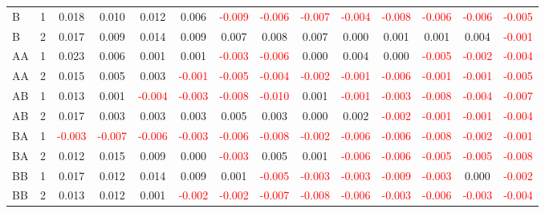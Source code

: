 \begin{table}[H]
{\begin{tabular}{llcccccccccccc}
B & 1 & 0.018 & 0.010 & 0.012 & 0.006 & \textcolor{red}{-0.009} & \textcolor{red}{-0.006} & \textcolor{red}{-0.007} & \textcolor{red}{-0.004} & \textcolor{red}{-0.008} & \textcolor{red}{-0.006} & \textcolor{red}{-0.006} & \textcolor{red}{-0.005}\\
B & 2 & 0.017 & 0.009 & 0.014 & 0.009 & 0.007 & 0.008 & 0.007 & 0.000 & 0.001 & 0.001 & 0.004 & \textcolor{red}{-0.001}\\
AA & 1 & 0.023 & 0.006 & 0.001 & 0.001 & \textcolor{red}{-0.003} & \textcolor{red}{-0.006} & 0.000 & 0.004 & 0.000 & \textcolor{red}{-0.005} & \textcolor{red}{-0.002} & \textcolor{red}{-0.004}\\
AA & 2 & 0.015 & 0.005 & 0.003 & \textcolor{red}{-0.001} & \textcolor{red}{-0.005} & \textcolor{red}{-0.004} & \textcolor{red}{-0.002} & \textcolor{red}{-0.001} & \textcolor{red}{-0.006} & \textcolor{red}{-0.001} & \textcolor{red}{-0.001} & \textcolor{red}{-0.005}\\
AB & 1 & 0.013 & 0.001 & \textcolor{red}{-0.004} & \textcolor{red}{-0.003} & \textcolor{red}{-0.008} & \textcolor{red}{-0.010} & 0.001 & \textcolor{red}{-0.001} & \textcolor{red}{-0.003} & \textcolor{red}{-0.008} & \textcolor{red}{-0.004} & \textcolor{red}{-0.007}\\
AB & 2 & 0.017 & 0.003 & 0.003 & 0.003 & 0.005 & 0.003 & 0.000 & 0.002 & \textcolor{red}{-0.002} & \textcolor{red}{-0.001} & \textcolor{red}{-0.001} & \textcolor{red}{-0.004}\\
BA & 1 & \textcolor{red}{-0.003} & \textcolor{red}{-0.007} & \textcolor{red}{-0.006} & \textcolor{red}{-0.003} & \textcolor{red}{-0.006} & \textcolor{red}{-0.008} & \textcolor{red}{-0.002} & \textcolor{red}{-0.006} & \textcolor{red}{-0.006} & \textcolor{red}{-0.008} & \textcolor{red}{-0.002} & \textcolor{red}{-0.001}\\
BA & 2 & 0.012 & 0.015 & 0.009 & 0.000 & \textcolor{red}{-0.003} & 0.005 & 0.001 & \textcolor{red}{-0.006} & \textcolor{red}{-0.006} & \textcolor{red}{-0.005} & \textcolor{red}{-0.005} & \textcolor{red}{-0.008}\\
BB & 1 & 0.017 & 0.012 & 0.014 & 0.009 & 0.001 & \textcolor{red}{-0.005} & \textcolor{red}{-0.003} & \textcolor{red}{-0.003} & \textcolor{red}{-0.009} & \textcolor{red}{-0.003} & 0.000 & \textcolor{red}{-0.002}\\
BB & 2 & 0.013 & 0.012 & 0.001 & \textcolor{red}{-0.002} & \textcolor{red}{-0.002} & \textcolor{red}{-0.007} & \textcolor{red}{-0.008} & \textcolor{red}{-0.006} & \textcolor{red}{-0.003} & \textcolor{red}{-0.006} & \textcolor{red}{-0.003} & \textcolor{red}{-0.004}\\

\end{tabular}}
\end{table}
